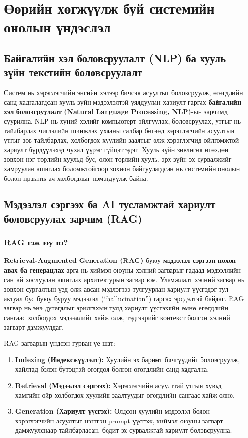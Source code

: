 \section{Өөрийн хөгжүүлж буй системийн онолын үндэслэл}

\subsection{Байгалийн хэл боловсруулалт (NLP) ба хууль зүйн текстийн боловсруулалт}

Систем нь хэрэглэгчийн энгийн хэлээр бичсэн асуултыг боловсруулж, өгөгдлийн санд хадгалагдсан хууль зүйн мэдээлэлтэй уялдуулан хариулт гаргах \textbf{байгалийн хэл боловсруулалт (Natural Language Processing, NLP)}-ын зарчимд суурилна. NLP нь хүний хэлийг компьютерт ойлгуулах, боловсруулах, утгыг нь тайлбарлах чиглэлийн шинжлэх ухааны салбар бөгөөд хэрэглэгчийн асуултын утгыг зөв тайлбарлах, холбогдох хуулийн заалтыг олж хэрэглэгчид ойлгомжтой хариулт бүрдүүлэхэд чухал үүрэг гүйцэтгэдэг. Хууль зүйн зөвлөгөө өгөхдөө зөвхөн нэг төрлийн хуульд бус, олон төрлийн хууль, эрх зүйн эх сурвалжийг хамруулан ашиглах боломжтойгоор зохион байгуулагдсан нь системийн онолын болон практик ач холбогдлыг нэмэгдүүлж байна.

\subsection{Мэдээлэл сэргээх ба AI тусламжтай хариулт боловсруулах зарчим (RAG)}

\subsubsection{RAG гэж юу вэ?}

\textbf{Retrieval-Augmented Generation (RAG)} буюу \textbf{мэдээлэл сэргээн нөхөн авах ба генерацлах} арга нь хиймэл оюуны хэлний загварыг гадаад мэдээллийн сантай хослуулан ашиглах архитектурын загвар юм. Уламжлалт хэлний загвар нь зөвхөн сургалтын үед олж авсан мэдлэгтээ тулгуурлан хариулт үүсгэдэг тул актуал бус буюу буруу мэдээлэл (``hallucination'') гаргах эрсдэлтэй байдаг. RAG загвар нь энэ дутагдлыг арилгахын тулд хариулт үүсгэхийн өмнө өгөгдлийн сангаас холбогдох мэдээллийг хайж олж, тэдгээрийг контекст болгон хэлний загварт дамжуулдаг.

RAG загварын үндсэн гурван үе шат:
\begin{enumerate}
    \item \textbf{Indexing (Индексжүүлэлт):} Хуулийн эх баримт бичгүүдийг боловсруулж, хайлтад бэлэн бүтэцтэй өгөгдөл болгон өгөгдлийн санд хадгална.
    \item \textbf{Retrieval (Мэдээлэл сэргээх):} Хэрэглэгчийн асуулттай утгын хувьд хамгийн ойр холбогдох хуулийн заалтуудыг өгөгдлийн сангаас хайж олно.
    \item \textbf{Generation (Хариулт үүсгэх):} Олдсон хуулийн мэдээлэл болон хэрэглэгчийн асуултыг нэгтгэн prompt үүсгэж, хиймэл оюуны загварт дамжуулснаар тайлбарласан, бодит эх сурвалжтай хариулт боловсруулна.
\end{enumerate}

